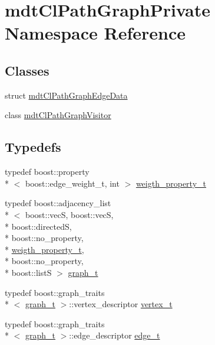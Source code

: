 \hypertarget{namespacemdt_cl_path_graph_private}{\section{mdt\-Cl\-Path\-Graph\-Private Namespace Reference}
\label{namespacemdt_cl_path_graph_private}
}
\subsection*{Classes}
\begin{DoxyCompactItemize}
\item 
struct \hyperlink{structmdt_cl_path_graph_private_1_1mdt_cl_path_graph_edge_data}{mdt\-Cl\-Path\-Graph\-Edge\-Data}
\item 
class \hyperlink{classmdt_cl_path_graph_private_1_1mdt_cl_path_graph_visitor}{mdt\-Cl\-Path\-Graph\-Visitor}
\end{DoxyCompactItemize}
\subsection*{Typedefs}
\begin{DoxyCompactItemize}
\item 
typedef boost\-::property\\*
$<$ boost\-::edge\-\_\-weight\-\_\-t, int $>$ \hyperlink{namespacemdt_cl_path_graph_private_a9ecaa62d3daff29e2314dec1780dbc21}{weigth\-\_\-property\-\_\-t}
\item 
typedef boost\-::adjacency\-\_\-list\\*
$<$ boost\-::vec\-S, boost\-::vec\-S, \\*
boost\-::directed\-S, \\*
boost\-::no\-\_\-property, \\*
\hyperlink{namespacemdt_cl_path_graph_private_a9ecaa62d3daff29e2314dec1780dbc21}{weigth\-\_\-property\-\_\-t}, \\*
boost\-::no\-\_\-property, \\*
boost\-::list\-S $>$ \hyperlink{namespacemdt_cl_path_graph_private_a0f07a8bdf4fa7671a93fe91d536b4793}{graph\-\_\-t}
\item 
typedef boost\-::graph\-\_\-traits\\*
$<$ \hyperlink{namespacemdt_cl_path_graph_private_a0f07a8bdf4fa7671a93fe91d536b4793}{graph\-\_\-t} $>$\-::vertex\-\_\-descriptor \hyperlink{namespacemdt_cl_path_graph_private_a0aaa28f25df9a7fcd4602cc15b3b3795}{vertex\-\_\-t}
\item 
typedef boost\-::graph\-\_\-traits\\*
$<$ \hyperlink{namespacemdt_cl_path_graph_private_a0f07a8bdf4fa7671a93fe91d536b4793}{graph\-\_\-t} $>$\-::edge\-\_\-descriptor \hyperlink{namespacemdt_cl_path_graph_private_a96eb891b98d89bbea2f573cd8f3accd2}{edge\-\_\-t}
\end{DoxyCompactItemize}


